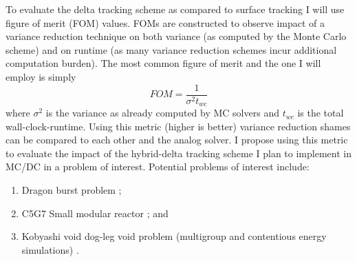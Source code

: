 To evaluate the delta tracking scheme as compared to surface tracking I will use figure of merit (FOM) values.
FOMs are constructed to observe impact of a variance reduction technique on both variance (as computed by the Monte Carlo scheme) and on runtime (as many variance reduction schemes incur additional computation burden).
The most common figure of merit and the one I will employ is simply
\begin{equation}
    FOM = \frac{1}{\sigma^2 t_{wc}}
\end{equation}
where $\sigma^2$ is the variance as already computed by MC solvers and $t_{wc}$ is the total wall-clock-runtime.
Using this metric (higher is better) variance reduction shames can be compared to each other and the analog solver.
I propose using this metric to evaluate the impact of the hybrid-delta tracking scheme I plan to implement in MC/DC in a problem of interest.
Potential problems of interest include:
\begin{enumerate}
    \item Dragon burst problem \cite{kimpland2021dragon};
    \item C5G7 Small modular reactor \cite{jia_hou_oecdnea_2017}; and
    \item Kobyashi void dog-leg void problem (multigroup and contentious energy simulations) \cite{Kobayashi2001}.
\end{enumerate}